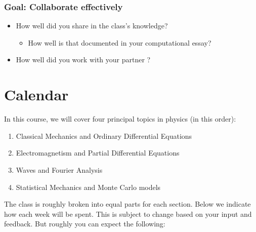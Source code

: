 \documentclass[letterpaper,10pt,english]{jupyterBook}
\begin{document}
\subsubsection{Goal: Collaborate effectively}
\label{\detokenize{content/0_course/4_rubric:goal-collaborate-effectively}}\begin{itemize}
\item {} 
\sphinxAtStartPar
How well did you share  in the class’s knowledge?
\begin{itemize}
\item {} 
\sphinxAtStartPar
How well is that documented in your computational essay?

\end{itemize}

\item {} 
\sphinxAtStartPar
How well did you work with your partner ? 

\end{itemize}

\sphinxstepscope


\section{Calendar}
\label{\detokenize{content/0_course/5_calendar:calendar}}\label{\detokenize{content/0_course/5_calendar::doc}}
\sphinxAtStartPar
In this course, we will cover four principal topics in physics (in this order):
\begin{enumerate}
%
\item {} 
\sphinxAtStartPar
Classical Mechanics and Ordinary Differential Equations

\item {} 
\sphinxAtStartPar
Electromagnetism and Partial Differential Equations

\item {} 
\sphinxAtStartPar
Waves and Fourier Analysis

\item {} 
\sphinxAtStartPar
Statistical Mechanics and Monte Carlo models

\end{enumerate}

\sphinxAtStartPar
The class is roughly broken into equal parts for each section. Below we indicate how each week will be spent. This is subject to change based on your input and feedback. But roughly you can expect the following:
\end{document}
